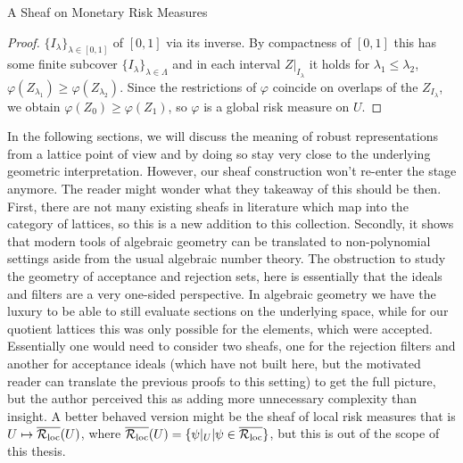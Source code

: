 \begin{subsection}{A Sheaf on Monetary Risk Measures}
\begin{proof}
        \( \{I_\lambda\}_{\lambda \in [0, 1]} \) of \( [0, 1] \) via its inverse. By compactness of \( [0, 1] \) this has some finite subcover \( \{I_\lambda\}_{\lambda \in \Lambda} \)
        and in each interval \( Z|_{I_\lambda} \) it holds for \( \lambda_1 \leq \lambda_2 \), \( \varphi(Z_{\lambda_1}) \geq \varphi(Z_{\lambda_2}) \). Since 
        the restrictions of \( \varphi \) coincide on overlaps of the \( Z_{I_\lambda} \), we obtain \( \varphi(Z_0) \geq \varphi(Z_1) \), so \( \varphi \) is a global risk measure
        on \( U \).
    \end{proof}

    In the following sections, we will discuss the meaning of robust representations from a lattice point of view and 
    by doing so stay very close to the underlying geometric interpretation. However, our sheaf construction won't re-enter the stage anymore. 
    The reader might wonder what they takeaway of this should be then. First, there are not many existing sheafs in literature 
    which map into the category of lattices, so this is a new addition to this collection. Secondly, it shows that modern tools of algebraic geometry
    can be translated to non-polynomial settings aside from the usual algebraic number theory. The obstruction to study the geometry of acceptance and rejection sets, 
    here is essentially that the ideals and filters are a very one-sided perspective. In algebraic geometry we have the luxury to be able to still evaluate sections on the underlying space,
    while for our quotient lattices this was only possible for the elements, which were accepted. Essentially one would need to consider two sheafs, 
    one for the rejection filters and another for acceptance ideals (which have not built here, but the motivated reader can translate the previous proofs to this setting) 
    to get the full picture, but the author perceived this as adding more unnecessary complexity than insight. A better behaved version might be the sheaf of local risk measures
    that is \( U \mapsto \overline{\mathcal{R}_{\text{loc}}}(U) \), where \( \overline{\mathcal{R}_{\text{loc}}}(U) = \{ \psi|_U | \psi \in \overline{\mathcal{R}_{\text{loc}}} \} \), but this is out of the scope of this thesis.
\end{subsection}
